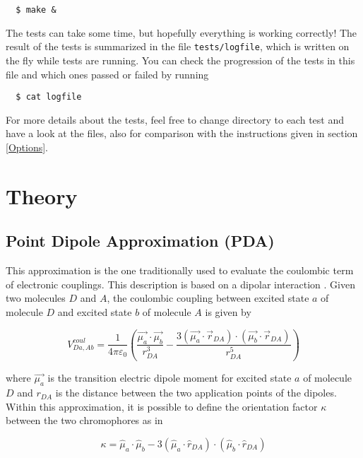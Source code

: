 \documentclass[a4paper]{article}
\begin{document}
\begin{verbatim}
  $ make &
\end{verbatim}

The tests can take some time, but hopefully everything is working correctly! The result of the tests is summarized in the file \verb|tests/logfile|, which is written on the fly while tests are running. You can check the progression of the tests in this file and which ones passed or failed by running

\begin{verbatim}
  $ cat logfile
\end{verbatim}

For more details about the tests, feel free to change directory to each test and have a look at the files, also for comparison with the instructions given in section \ref{Options}.

\section{Theory}
\subsection*{Point Dipole Approximation (PDA)}
This approximation is the one traditionally used to evaluate the coulombic term of electronic couplings. This description is based on a dipolar interaction \cite{PDA}.  Given two molecules $D$ and $A$, the coulombic coupling between excited state $a$ of molecule $D$ and excited state $b$ of molecule $A$ is given by

\begin{equation}
 V^{coul}_{Da,Ab} = \frac{1}{4\pi\varepsilon_0} \left( \frac{\vec{\mu_a}\cdot\vec{\mu_b}}{r_{DA}^3} - \frac{3(\vec{\mu_a}\cdot \vec{r}_{DA})\cdot(\vec{\mu_b}\cdot\vec{r}_{DA})}{r_{DA}^5} \right)
 \label{eq:PDA}
\end{equation}

where $\vec{\mu_a}$ is the transition electric dipole moment for excited state $a$ of molecule $D$ and $r_{DA}$ is the distance between the two application points of the dipoles. Within this approximation, it is possible to define the orientation factor $\kappa$ between the two chromophores as in

\begin{equation}
 \kappa = \hat{\mu}_a\cdot\hat{\mu}_b - 3(\hat{\mu}_a\cdot \hat{r}_{DA})\cdot(\hat{\mu}_b\cdot\hat{r}_{DA})
 \label{eq:orifac}
\end{equation}
\end{document}
